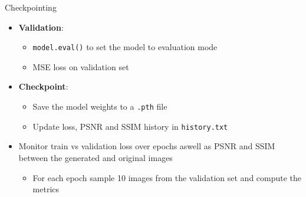 \begin{frame}{Checkpointing}
    \begin{itemize}
        \item \textbf{Validation}:
              \begin{itemize}
                  \item \texttt{model.eval()} to set the model to evaluation mode
                  \item MSE loss on validation set
              \end{itemize}
        \item \textbf{Checkpoint}:
              \begin{itemize}
                  \item Save the model weights to a \texttt{.pth} file
                  \item Update loss, PSNR and SSIM history in \texttt{history.txt}
              \end{itemize}
        \item Monitor train vs validation loss over epochs aswell as PSNR and SSIM between the generated and original images
              \begin{itemize}
                  \item For each epoch sample 10 images from the validation set and compute the metrics
              \end{itemize}
    \end{itemize}
\end{frame}

